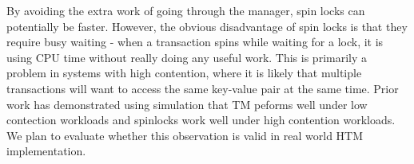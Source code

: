 By avoiding the extra work of going through the manager, spin locks can
potentially be faster. However, the obvious disadvantage of spin locks is that
they require busy waiting - when a transaction spins while waiting for a lock,
it is using CPU time without really doing any useful work. This is primarily a
problem in systems with high contention, where it is likely that multiple
transactions will want to access the same key-value pair at the same time. Prior
work \citep{tran2010} has demonstrated using simulation that TM peforms well
under low contection workloads and spinlocks work well under high contention
workloads. We plan to evaluate whether this observation is valid in real world
HTM implementation.

